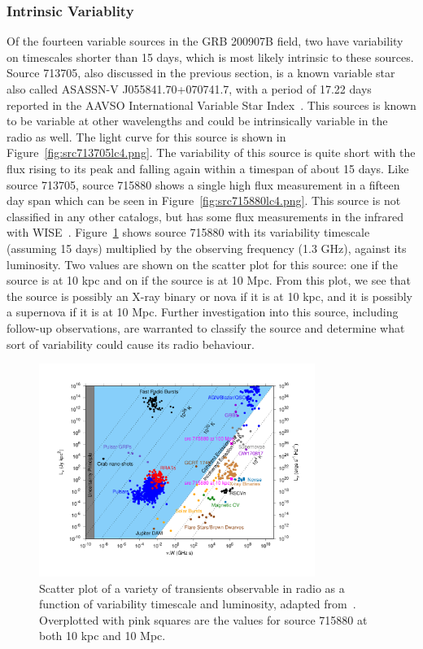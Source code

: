 \documentclass[12pt]{article}
\begin{document}
\subsubsection{Intrinsic Variablity}
Of the fourteen variable sources in the GRB 200907B field, two have variability on timescales shorter than 15 days, which is most likely intrinsic to these sources. Source 713705, also discussed in the previous section, is a known variable star also called ASASSN-V J055841.70+070741.7, with a period of 17.22 days reported in the AAVSO International Variable Star Index~\citep{2006SASS...25...47W}. This sources is known to be variable at other wavelengths and could be intrinsically variable in the radio as well. The light curve for this source is shown in Figure~\ref{fig:src713705lc4.png}. The variability of this source is quite short with the flux rising to its peak and falling again within a timespan of about 15 days. Like source 713705, source 715880 shows a single high flux measurement in a fifteen day span which can be seen in Figure~\ref{fig:src715880lc4.png}. This source is not classified in any other catalogs, but has some flux measurements in the infrared with WISE~\citep{2014yCat.2328....0C}. Figure~\ref{fig:transphasespace} shows source 715880 with its variability timescale (assuming 15 days) multiplied by the observing frequency (1.3 GHz), against its luminosity. Two values are shown on the scatter plot for this source: one if the source is at 10 kpc and on if the source is at 10 Mpc. From this plot, we see that the source is possibly an X-ray binary or nova if it is at 10 kpc, and it is possibly a supernova if it is at 10 Mpc. Further investigation into this source, including follow-up observations, are warranted to classify the source and determine what sort of variability could cause its radio behaviour.

\begin{figure}
	\includegraphics[width=0.8\textwidth]{phase_space_ewass.pdf}
	\caption{Scatter plot of a variety of transients observable in radio as a function of variability timescale and luminosity, adapted from~\citet{2015MNRAS.446.3687P}. Overplotted with pink squares are the values for source 715880 at both 10 kpc and 10 Mpc.}
	\label{fig:transphasespace}
\end{figure}
\end{document}
